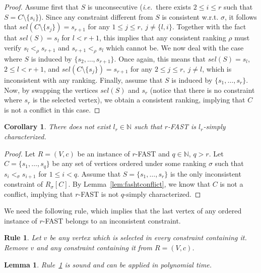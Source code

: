 \documentclass[11pt]{article}
\newtheorem{corollary}[theorem]{Corollary}
\newtheorem{lemma}[theorem]{Lemma}
\newtheorem{polyrule}{Rule}[section]
\def\ie{{\em i.e.}~}
\begin{document}
\begin{proof}
	Assume first that $S$ is unconsecutive (\ie there exists $2 \leqslant i \leqslant r$ such that $S = C \setminus \{s_i\}$). Since any constraint different from $S$ is consistent w.r.t. $\sigma$, it follows that $sel(C \setminus \{s_j\}) = s_{r+1}$ for any $1 \leqslant j \leqslant r,\ j \neq \{l,i\}$. Together with the fact that $sel(S) = s_l$ for $l < r+1$, this implies that any consistent ranking $\rho$ must verify $s_l <_\rho s_{r+1}$ and $s_{r+1} <_\rho s_l$ which cannot be.
	We now deal with the case where $S$ is induced by $\{s_2, \ldots, s_{r+1}\}$. Once again, this means that $sel(S) = s_l$, $2 \leqslant l < r +1$, and $sel(C \setminus \{s_j\}) = s_{r+1}$ for any $2 \leqslant j \leqslant r,\ j \neq l$, which is inconsistent with any ranking. 
	Finally, assume that $S$ is induced by $\{s_1, \ldots, s_r\}$. Now, by swapping  
	the vertices $sel(S)$ and $s_r$ (notice that there is no constraint where $s_r$ is 
	the selected vertex), we 
	obtain a consistent ranking, implying that $C$ is not a conflict in this case. 
 \end{proof}
	
\begin{corollary}
\label{coro:fashtlr}
	There does not exist $l_r \in \mathbb{N}$ such that {\sc $r$-FAST} is $l_r$-simply characterized. 
\end{corollary}

\begin{proof}
	Let $R = (V,c)$ be an instance of {\sc $r$-FAST} and $q \in \mathbb{N}$, $q > r$. 
	Let $C = \{s_1, \ldots, s_q\}$ be any set of vertices ordered 
under some ranking $\sigma$ such 
that $s_i <_\sigma s_{i+1}$ for $1 \leqslant i < q$. Assume that $S = \{s_1, \ldots, s_r\}$ is the only inconsistent constraint of $R_\sigma[C]$. By Lemma~\ref{lem:fashtconflict}, we know that $C$ is not a conflict, implying that $r$-FAST is not $q$-simply 
characterized. 
 \end{proof}

We need the following rule, 
which implies that the last vertex of any ordered instance of {\sc $r$-FAST} belongs 
to an inconsistent constraint. 

\begin{polyrule}
\label{rule:uselessvertex}
	Let $v$ be any vertex which is selected in every constraint containing it. Remove 
	$v$ and any constraint containing it from $R = (V,c)$. 
\end{polyrule}

\begin{lemma}
\label{lem:uselessvertex}
	Rule~\ref{rule:uselessvertex} is sound and can be applied in polynomial time.
\end{lemma}
\end{document}
